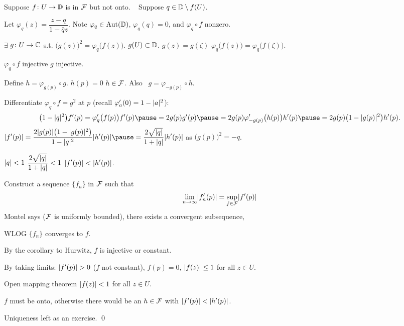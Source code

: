 \documentclass[10pt,aspectratio=169]{beamer}
\begin{document}
\begin{frame}
Suppose $f \colon U \to {\mathbb{D}}$ is in ${\mathcal{F}}$ but not onto.
\pause
~
Suppose $q \in {\mathbb{D}} \setminus f(U)$.

\pause
Let $\varphi_q(z) = \dfrac{z-q}{1-\bar{q}z}$.
\quad
Note $\varphi_q \in \operatorname{Aut}({\mathbb{D}})$, \quad $\varphi_q(q)=0$, \quad
and $\varphi_q \circ f$ nonzero.

\pause
$\exists$ $g \colon U \to {\mathbb{C}}$ s.t.
${\bigl(g(z)\bigr)}^2 = \varphi_q\bigl(f(z)\bigr)$.
\pause
\quad
$g(U) \subset {\mathbb{D}}$.
\pause
\quad
$g(z)=g(\zeta)$ \wthus $\varphi_q\bigl(f(z)\bigr)=\varphi_q\bigl(f(\zeta)\bigr)$.

\pause
$\varphi_q \circ f$ injective \wthus $g$ injective.
\quad

\pause
\medskip

Define
$h = \varphi_{g(p)} \circ g$.
\quad \pause
$h(p) =0$ \wthus $h \in {\mathcal{F}}$.
\pause
\quad
Also
~$g = \varphi_{-g(p)} \circ h$.

\pause
\medskip

Differentiate
$\varphi_q \circ f = g^2$ at $p$ (recall $\varphi_a'(0) = 1-\lvert {a} \rvert^2$):
\pause
\[
\bigl(1-\sabs{q}^2\bigr) f'(p)
= \varphi_q'\bigl(f(p)\bigr) f'(p)
\pause
= 2 g(p) g'(p)
\pause
= 2 g(p) \varphi_{-g(p)}'\bigl(h(p)\bigr) h'(p)
\pause
= 2 g(p) \bigl(1-\sabs{g(p)}^2\bigr) h'(p) .
\]
\pause
$\displaystyle
\sabs{f'(p)} =
\frac{2 \sabs{g(p)} \bigl(1-\sabs{g(p)}^2\bigr)}{1-\sabs{q}^2} \sabs{h'(p)}
\pause
=
\frac{2 \sqrt{\sabs{q}}}{1+\sabs{q}} \sabs{h'(p)}
$
\qquad as
${\bigl(g(p)\bigr)}^2 = -q$.

\pause
\medskip

$\lvert {q} \rvert < 1$
\wthus
$\displaystyle \frac{2 \sqrt{\lvert {q} \rvert}}{1+\lvert {q} \rvert} < 1$
\pause
\wthus
$\displaystyle \lvert {f'(p)} \rvert < \lvert {h'(p)} \rvert$.
\end{frame}

\begin{frame}
Construct a sequence $\{ f_n \}$ in  ${\mathcal{F}}$ such that 
\[
\lim_{n \to \infty} \lvert {f_n'(p)} \rvert = \sup_{f \in {\mathcal{F}}} \lvert {f'(p)} \rvert
\]
\pause
Montel says (${\mathcal{F}}$ is uniformly bounded),
there exists a convergent subsequence,

\pause
WLOG $\{ f_n \}$ converges to $f$.

\medskip
\pause

By the corollary to Hurwitz, $f$ is injective or constant.

\medskip
\pause
By taking limits: $\lvert {f'(p)} \rvert > 0$ ($f$ not constant),
\pause
\quad
$f(p) = 0$,
\pause
\quad
$\lvert {f(z)} \rvert \leq 1$ for all $z \in U$.

\pause
Open mapping theorem \wthus
$\lvert {f(z)} \rvert < 1$ for all $z \in U$.

\medskip
\pause
$f$ must be onto, otherwise there would be an $h \in {\mathcal{F}}$ with
$\lvert {f'(p)} \rvert < \lvert {h'(p)} \rvert$.

\medskip
\pause
Uniqueness left as an exercise. \qed
\end{frame}
\end{document}
